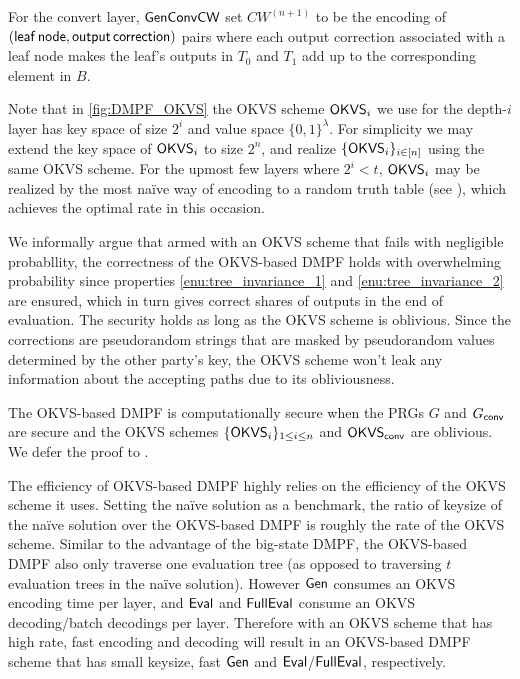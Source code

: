 For the convert layer, $\sf GenConvCW$ set $CW^{(n+1)}$ to be the encoding of $\sf (leaf\,node, output\,correction)$ pairs where each output correction associated with a leaf node makes the leaf's outputs in $T_0$ and $T_1$ add up to the corresponding element in $B$. 

Note that in \cref{fig:DMPF_OKVS} the OKVS scheme ${\sf OKVS}_i$ we use for the depth-$i$ layer has key space of size $2^i$ and value space $\{0,1\}^\lambda$. For simplicity we may extend the key space of ${\sf OKVS}_i$ to size $2^n$, and realize $\{{\sf OKVS}_i\}_{i\in[n]}$ using the same OKVS scheme. For the upmost few layers where $2^i<t$, ${\sf OKVS}_i$ may be realized by the most na\"ive way of encoding to a random truth table (see ), which achieves the optimal rate in this occasion. 



We informally argue that armed with an OKVS scheme that fails with negligible probabllity, the correctness of the OKVS-based DMPF holds with overwhelming probability since properties \ref{enu:tree_invariance_1} and \ref{enu:tree_invariance_2} are ensured, which in turn gives correct shares of outputs in the end of evaluation. The security holds as long as the OKVS scheme is oblivious. Since the corrections are pseudorandom strings that are masked by pseudorandom values determined by the other party's key, the OKVS scheme won't leak any information about the accepting paths due to its obliviousness. 

The OKVS-based DMPF is computationally secure when the PRGs $G$ and $G_{\sf conv}$ are secure and the OKVS schemes $\{{\sf OKVS}_i\}_{1\le i\le n}$ and ${\sf OKVS}_{\sf conv}$ are oblivious. We defer the proof to . 

The efficiency of OKVS-based DMPF highly relies on the efficiency of the OKVS scheme it uses. Setting the na\"ive solution as a benchmark, the ratio of keysize of the na\"ive solution over the OKVS-based DMPF is roughly the rate of the OKVS scheme. Similar to the advantage of the big-state DMPF, the OKVS-based DMPF also only traverse one evaluation tree (as opposed to traversing $t$ evaluation trees in the na\"ive solution). However ${\sf Gen}$ consumes an OKVS encoding time per layer, and ${\sf Eval}$ and ${\sf FullEval}$ consume an OKVS decoding/batch decodings per layer. Therefore with an OKVS scheme that has high rate, fast encoding and decoding will result in an OKVS-based DMPF scheme that has small keysize, fast ${\sf Gen}$ and ${\sf Eval}$/${\sf FullEval}$, respectively. 

